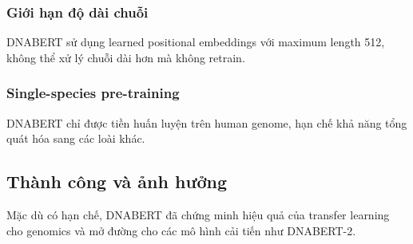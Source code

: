 \subsubsection{Giới hạn độ dài chuỗi}

DNABERT sử dụng learned positional embeddings với maximum length 512, không thể xử lý chuỗi dài hơn mà không retrain.

\subsubsection{Single-species pre-training}

DNABERT chỉ được tiền huấn luyện trên human genome, hạn chế khả năng tổng quát hóa sang các loài khác.

\subsection{Thành công và ảnh hưởng}

Mặc dù có hạn chế, DNABERT đã chứng minh hiệu quả của transfer learning cho genomics và mở đường cho các mô hình cải tiến như DNABERT-2.

